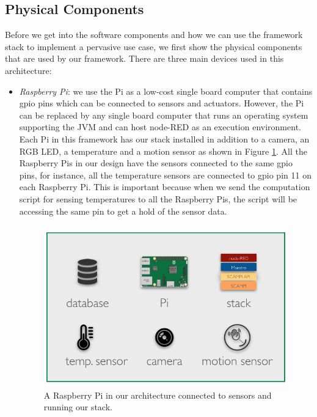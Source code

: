 \subsection{Physical Components}
Before we get into the software components and how we can use the framework stack to implement a pervasive use case, we first show the physical components that are used by our framework. There are three main devices used in this architecture:
\begin{itemize}
\item \textit{Raspberry Pi}: we use the Pi as a low-cost single board computer that contains gpio pins which can be connected to sensors and actuators.  However, the Pi can be replaced by any single board computer that runs an operating system supporting the JVM and can host node-RED as an execution environment. Each Pi in this framework has our stack installed in addition to a camera,  an RGB LED, a temperature and a motion sensor as shown in Figure \ref{fig:node}. All the Raspberry Pis in our design have the sensors connected to the same gpio pins, for instance, all the temperature sensors are connected to gpio pin 11 on each  Raspberry Pi. This is important because when we send the computation script for sensing temperatures to all the Raspberry Pis, the script will be accessing the same pin to get a hold of the sensor data. \\



\begin{figure}[H]
	\centering
	\includegraphics[scale=0.5]{images/node.png}
	\caption{A Raspberry Pi in our architecture connected to sensors and running our stack. }
	\label{fig:node}
\end{figure}


\end{itemize}

